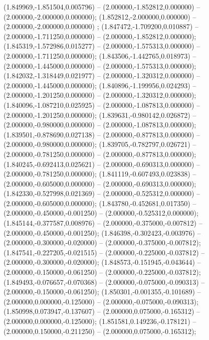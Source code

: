 (1.849969,-1.851504,0.005796) -- (2.000000,-1.852812,0.000000) -- (2.000000,-2.000000,0.000000);
 (1.852812,-2.000000,0.000000) -- (2.000000,-2.000000,0.000000) ;
 (1.847472,-1.709200,0.010887) -- (2.000000,-1.711250,0.000000) -- (2.000000,-1.852812,0.000000);
 (1.845319,-1.572986,0.015277) -- (2.000000,-1.575313,0.000000) -- (2.000000,-1.711250,0.000000);
 (1.843506,-1.442765,0.018973) -- (2.000000,-1.445000,0.000000) -- (2.000000,-1.575313,0.000000);
 (1.842032,-1.318449,0.021977) -- (2.000000,-1.320312,0.000000) -- (2.000000,-1.445000,0.000000);
 (1.840896,-1.199956,0.024293) -- (2.000000,-1.201250,0.000000) -- (2.000000,-1.320312,0.000000);
 (1.840096,-1.087210,0.025925) -- (2.000000,-1.087813,0.000000) -- (2.000000,-1.201250,0.000000);
 (1.839631,-0.980142,0.026872) -- (2.000000,-0.980000,0.000000) -- (2.000000,-1.087813,0.000000);
 (1.839501,-0.878690,0.027138) -- (2.000000,-0.877813,0.000000) -- (2.000000,-0.980000,0.000000);
 (1.839705,-0.782797,0.026721) -- (2.000000,-0.781250,0.000000) -- (2.000000,-0.877813,0.000000);
 (1.840245,-0.692413,0.025621) -- (2.000000,-0.690313,0.000000) -- (2.000000,-0.781250,0.000000);
 (1.841119,-0.607493,0.023838) -- (2.000000,-0.605000,0.000000) -- (2.000000,-0.690313,0.000000);
 (1.842330,-0.527998,0.021369) -- (2.000000,-0.525312,0.000000) -- (2.000000,-0.605000,0.000000);
 (1.843780,-0.452681,0.017350) -- (2.000000,-0.450000,-0.001250) -- (2.000000,-0.525312,0.000000);
 (1.845144,-0.377587,0.008976) -- (2.000000,-0.375000,-0.007812) -- (2.000000,-0.450000,-0.001250);
 (1.846398,-0.302423,-0.003976) -- (2.000000,-0.300000,-0.020000) -- (2.000000,-0.375000,-0.007812);
 (1.847541,-0.227205,-0.021515) -- (2.000000,-0.225000,-0.037812) -- (2.000000,-0.300000,-0.020000);
 (1.848573,-0.151945,-0.043644) -- (2.000000,-0.150000,-0.061250) -- (2.000000,-0.225000,-0.037812);
 (1.849493,-0.076657,-0.070368) -- (2.000000,-0.075000,-0.090313) -- (2.000000,-0.150000,-0.061250);
 (1.850301,-0.001355,-0.101689) -- (2.000000,0.000000,-0.125000) -- (2.000000,-0.075000,-0.090313);
 (1.850998,0.073947,-0.137607) -- (2.000000,0.075000,-0.165312) -- (2.000000,0.000000,-0.125000);
 (1.851581,0.149236,-0.178121) -- (2.000000,0.150000,-0.211250) -- (2.000000,0.075000,-0.165312);

